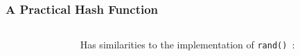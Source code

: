 
\begin{frame}[fragile]
\frametitle{A Practical Hash Function}
\begin{columns}[T]

\begin{column}{0.45\textwidth}

\end{column}

\pause
\begin{column}{0.45\textwidth}
{\small
Has similarities to the implementation of \verb^rand()^~:
}

\end{column}

\end{columns}
\end{frame}



